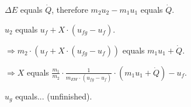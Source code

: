 \( \Delta E \) equals \( \dot{Q} \), therefore \( m_2 u_2 - m_1 u_1 \) equals \( \dot{Q} \).  

\( u_2 \) equals \( u_f + X \cdot (u_{fg} - u_f) \).  

\( \Rightarrow m_2 \cdot (u_f + X \cdot (u_{fg} - u_f)) \) equals \( m_1 u_1 + \dot{Q} \).  

\( \Rightarrow X \) equals \( \frac{m_1}{m_2} \cdot \frac{1}{m_{EW} \cdot (u_{fg} - u_f)} \cdot (m_1 u_1 + \dot{Q}) - u_f \).  

\( u_g \) equals... (unfinished).